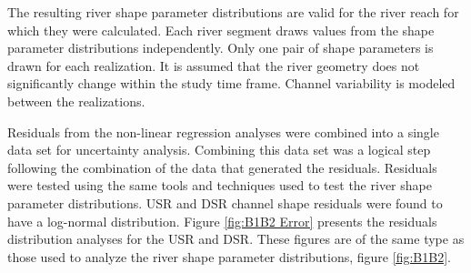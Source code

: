 The resulting river shape parameter distributions are valid for the river reach for which they were calculated.  Each river segment draws values from the shape parameter distributions independently.  Only one pair of shape parameters is drawn for each realization.  It is assumed that the river geometry does not significantly change within the study time frame.  Channel variability is modeled between the realizations.

Residuals from the non-linear regression analyses were combined into a single data set for uncertainty analysis.  Combining this data set was a logical step following the combination of the data that generated the residuals.  Residuals were tested using the same tools and techniques used to test the river shape parameter distributions.  USR and DSR channel shape residuals were found to have a log-normal distribution.  Figure \ref{fig:B1B2 Error} presents the residuals distribution analyses for the USR and DSR.  These figures are of the same type as those used to analyze the river shape parameter distributions, figure \ref{fig:B1B2}.

